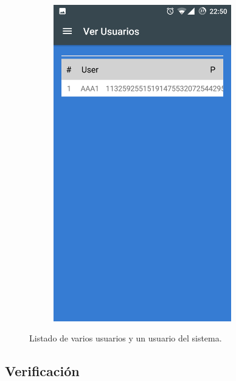 \documentclass[../PFC.tex]{subfiles}
\begin{document}
\begin{figure}[H]
\begin{subfigure}{0.4\textwidth}
    \end{subfigure}          
    \qquad\qquad\qquad  %
    \begin{subfigure}{0.4\textwidth}  
       \centering
       \includegraphics[width=0.85\textwidth]{./img/app/nuevoUsuarioInsertado}
    \end{subfigure}   
  \caption{Listado de varios usuarios y un usuario del sistema.}
  \label{img:app:verUsuarios}
\end{figure}

\subsection{Verificación}
\label{App:Verificacion}
\end{document}
